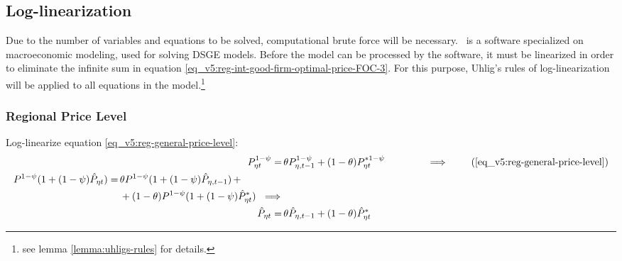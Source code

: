 \documentclass[../thesis.tex]{subfiles}
\begin{document}
		\begin{comment}
			Y_{1} &= \left[ \left( \frac{a_{1}}{1 - b_{1}} \right) \left( \frac{1}{\omega_{11}^{\omega_{11}} (1 - \omega_{11})^{1 - \omega_{11}}} \right) \right]^{\frac{\sigma}{\sigma + \varphi}} \tag{\ref{eq_v5:reg-ss-total-y1}}
			\\
			Y_{2} &= \left[ \left( \frac{a_{2}}{1 - b_{2}} \right) \left( \frac{1}{\omega_{21}^{\omega_{21}} (1 - \omega_{21})^{1 - \omega_{21}}} \right) \right]^{\frac{\sigma}{\sigma + \varphi}} \tag{\ref{eq_v5:reg-ss-total-y2}}
			\\
		\end{comment}

	\newpage
	
	
\subsection{Log-linearization}
	
	Due to the number of variables and equations to be solved, computational brute force will be necessary. \dynare \ is a software specialized on macroeconomic modeling, used for solving DSGE models. Before the model can be processed by the software, it must be linearized in order to eliminate the infinite sum in equation \ref{eq_v5:reg-int-good-firm-optimal-price-FOC-3}. For this purpose, Uhlig's rules of log-linearization \cite{uhlig_toolkit_1999} will be applied to all equations in the model.\footnote{see lemma \ref{lemma:uhligs-rules} for details.}


\subsubsection*{Regional Price Level}

Log-linearize equation \ref{eq_v5:reg-general-price-level}:
\begin{align}
	P_{\eta t}^{1-\psi} =\, &\theta P_{\eta, t-1}^{1-\psi} + (1-\theta) P_{\eta t}^{\ast 1-\psi} \qquad \qquad \implies \tag{\ref{eq_v5:reg-general-price-level}} \\
	\begin{split} P^{1-\psi} (1 + (1-\psi)\hat{P}_{\eta t}) =\, &\theta P^{1-\psi} (1 + (1-\psi)\hat{P}_{\eta, t-1}) \, + \\ & + (1-\theta) P^{1-\psi} (1 + (1-\psi)\hat{P}_{\eta t}^{\ast}) \ \implies \nonumber \end{split} \\
	\hat{P}_{\eta t} =\, &\theta \hat{P}_{\eta, t-1} + (1-\theta) \hat{P}_{\eta t}^{\ast}
	\label{eq_v5:reg-ll-general-price-level}
\end{align}
\end{document}
